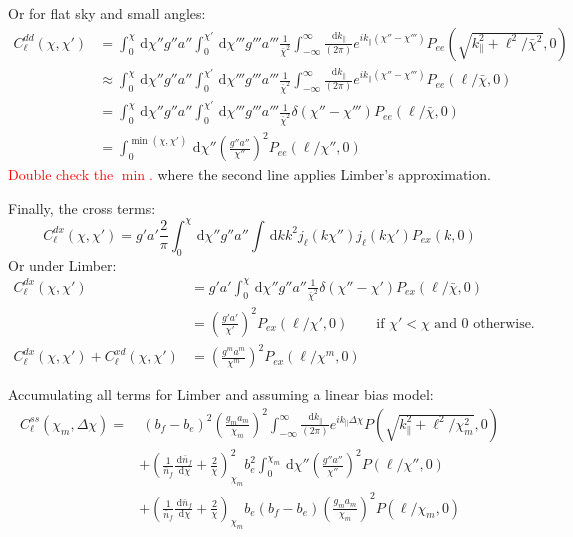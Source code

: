 \documentclass[onecolumn,prd,nofootinbib]{revtex4-1}
\newcommand{\ud}{\,\mathrm{d}}
\newcommand{\red}{\textcolor{red}}
\begin{document}
Or for flat sky and small angles:
\begin{align}
C^{dd}_\ell(\chi,\chi') 
    &=
    \int_0^\chi\ud\chi''g''a''
    \int_0^{\chi'}\ud\chi'''g'''a'''
    \frac{1}{\bar\chi^2}
    \int_{-\infty}^\infty\frac{\ud k_\parallel}{(2 \pi)} 
    e^{i k_\parallel (\chi'' - \chi''')}
    P_{ee}(\sqrt{k_\parallel^2 + \ell^2/\bar\chi^2}, 0)
    \\
    &\approx
    \int_0^\chi\ud\chi''g''a''
    \int_0^{\chi'}\ud\chi'''g'''a'''
    \frac{1}{\bar\chi^2}
    \int_{-\infty}^\infty\frac{\ud k_\parallel}{(2 \pi)} 
    e^{i k_\parallel (\chi'' - \chi''')}
    P_{ee}(\ell/\bar\chi, 0)
    \\
    &=
    \int_0^\chi\ud\chi''g''a''
    \int_0^{\chi'}\ud\chi'''g'''a'''
    \frac{1}{\bar\chi^2}
    \delta(\chi'' - \chi''')
    P_{ee}(\ell/\bar\chi, 0)
    \\
    &=
    \int_0^{\min(\chi,\chi')}\ud\chi''
    \left(\frac{g''a''}{\chi''}\right)^2
    P_{ee}(\ell/\chi'', 0)
\end{align}
\red{Double check the $\min$.}
where the second line applies Limber's approximation.

Finally, the cross terms:
\begin{equation}
C^{dx}_\ell(\chi,\chi')
    =
    g'a'
    \frac{2}{\pi}
    \int_0^\chi\ud\chi''g''a''
    \int\ud k k^2 j_\ell(k\chi'') j_{\ell}(k\chi')P_{ex}(k, 0)
\end{equation}
Or under Limber:
\begin{align}
C^{dx}_\ell(\chi,\chi')
    &=
    g'a'
    \int_0^\chi\ud\chi''g''a''
    \frac{1}{\bar\chi^2}
    \delta(\chi'' - \chi')
    P_{ex}(\ell/\bar\chi, 0)
    \\
    &=
    \left(\frac{g'a'}{\chi'}\right)^2
    P_{ex}(\ell/\chi', 0)
    \qquad \textrm{if $\chi' < \chi$ and 0 otherwise.}
    \\
C^{dx}_\ell(\chi,\chi') + C^{xd}_\ell(\chi,\chi')
    &=
    \left(\frac{g^ma^m}{\chi^m}\right)^2
    P_{ex}(\ell/\chi^m, 0)
\end{align}

Accumulating all terms for Limber and assuming a linear bias model:
\begin{align}
C^{ss}_\ell(\chi_m,\Delta\chi) =&~
    (b_f - b_e)^2 \left(\frac{g_m a_m}{\chi_m}\right)^2
        \int_{-\infty}^\infty\frac{\ud k_\parallel}{(2 \pi)} 
        e^{i k_\parallel \Delta\chi}
        P(\sqrt{k_\parallel^2 + \ell^2/\chi_m^2}, 0)
    \\ &+
    \left(\frac{1}{\bar{n}_f}\frac{\ud \bar{n}_f}{\ud \chi}
    + \frac{2}{\chi} \right)_{\chi_m}^2
    b_e^2 \int_0^{\chi_m}\ud\chi''
        \left(\frac{g''a''}{\chi''}\right)^2
        P(\ell/\chi'', 0)
    \\ &+
    \left(\frac{1}{\bar{n}_f}\frac{\ud \bar{n}_f}{\ud \chi}
    + \frac{2}{\chi} \right)_{\chi_m}
    b_e(b_f - b_e)\left(\frac{g_m a_m}{\chi_m}\right)^2
        P(\ell/\chi_m, 0)
\end{align}
\end{document}
